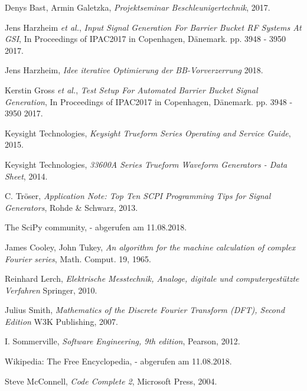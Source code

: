 \documentclass[../Report.tex]{subfiles}
\begin{document}


\begin{thebibliography}{9}
  
	Denys Bast, Armin Galetzka, 
	\textit{Projektseminar Beschleunigertechnik},
	2017.
 
	Jens Harzheim \textit{et al.}, 
	\textit{Input Signal Generation For Barrier Bucket RF Systems At GSI}, In Proceedings of IPAC2017 in Copenhagen, Dänemark. 
	pp. 3948 - 3950
	2017.

	Jens Harzheim,
	\textit{Idee iterative Optimierung der BB-Vorverzerrung}
	2018.
	
	Kerstin Gross \textit{et al.},
	\textit{Test Setup For Automated Barrier Bucket Signal Generation},
	In Proceedings of IPAC2017 in Copenhagen, Dänemark. 
	pp. 3948 - 3950
	2017.
	
	Keysight Technologies,
	\textit{Keysight Trueform Series Operating and Service Guide},
	2015.

	Keysight Technologies,
	\textit{33600A Series Trueform Waveform Generators - Data Sheet},
	2014.
	
	C. Tröser, 
	\textit{Application Note: Top Ten SCPI Programming Tips for Signal Generators},
	Rohde \& Schwarz,
	2013.
	
	The SciPy community,
	- abgerufen am 11.08.2018.
	
	James Cooley, John Tukey,
	\textit{An algorithm for the machine calculation of complex Fourier series},
	Math. Comput. 19,
	1965.
	
	Reinhard Lerch,
	\textit{Elektrische Messtechnik, Analoge, digitale und computergestützte Verfahren}
	Springer,
	2010.

	Julius Smith,	
	\textit{Mathematics of the Discrete Fourier Transform (DFT), Second Edition}
	W3K Publishing, 
	2007.

	
	I. Sommerville,
	\textit{Software Engineering, 9th edition},
	Pearson,
	2012.
	
	Wikipedia: The Free Encyclopedia,	
	- abgerufen am 11.08.2018. 
	
	Steve McConnell,
	\textit{Code Complete 2},
	Microsoft Press,	
	2004. 
	

\end{thebibliography}
\end{document}
